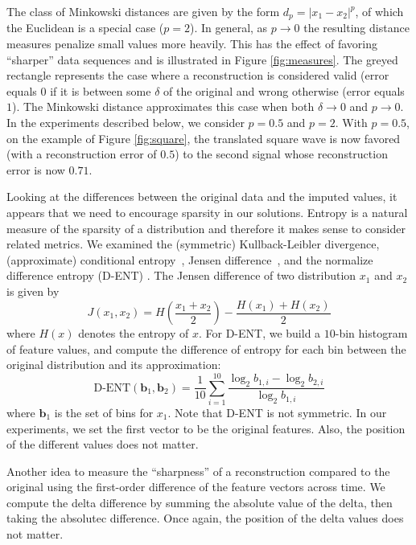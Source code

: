 \documentclass{article}
\newcommand{\FIXME}[2][FIXME]{}%
\begin{document}

The class of Minkowski distances are given by the form $d_p =
|x_1-x_2|^p$, of which the Euclidean is a special case ($p=2$).  In
general, as $p \rightarrow 0$ the resulting distance measures penalize
small values more heavily.  This has the effect of favoring
``sharper'' data sequences and is illustrated in Figure
\ref{fig:measures}.  The greyed rectangle represents the case where a
reconstruction is considered valid (error equals $0$ if it is between
some $\delta$ of the original and wrong otherwise (error equals $1$).
The Minkowski distance approximates this case when both
$\delta \rightarrow 0$ and $p \rightarrow 0$.  In the experiments described
below, we consider $p=0.5$ and $p=2$.  With $p=0.5$, on the example of
Figure \ref{fig:square}, the translated square wave is now favored
(with a reconstruction error of $0.5$) to the second signal whose
reconstruction error is now $0.71$.

Looking at the differences between the original data and the imputed
values, it appears that we need to encourage sparsity in our
solutions.  Entropy is a natural measure of the sparsity of a
distribution and therefore it makes sense to consider related metrics.
We examined the (symmetric) Kullback-Leibler divergence, (approximate)
conditional entropy~\cite{Peng2005}, Jensen
difference~\cite{Michel1994}, and the normalize difference entropy
(D-ENT) \cite{Mentzelopoulos2004}.  The Jensen difference of two
distribution $x_1$ and $x_2$ is given by
%
$$
J(x_1,x_2) = H\left(\frac{x_1+x_2}{2}\right) - \frac{H(x_1) + H(x_2)}{2}
$$
%
where $H(x)$ denotes the entropy of $x$.  For D-ENT, we build a
$10$-bin histogram of feature values, and compute the difference
of entropy for each bin between the original distribution and its
approximation:
$$
\mbox{D-ENT}(\mathbf{b}_1,\mathbf{b}_2) = \frac{1}{10}\sum_{i=1}^{10} \frac{\log_2 b_{1,i} - \log_2 b_{2,i}}{\log_2 b_{1,i}} %
$$
where $\mathbf{b}_1$ is the set of bins for $x_1$.  Note that D-ENT is
not symmetric. In our experiments, we set the first vector to be the
original features. Also, the position of the different values does not
matter.

Another idea to measure the ``sharpness'' of a reconstruction compared
to the original using the first-order difference of the feature
vectors across time. We compute the  delta difference by summing
the absolute value of the delta, then taking the absolutec
difference. Once again, the position of the delta values does not
matter.
\end{document}
